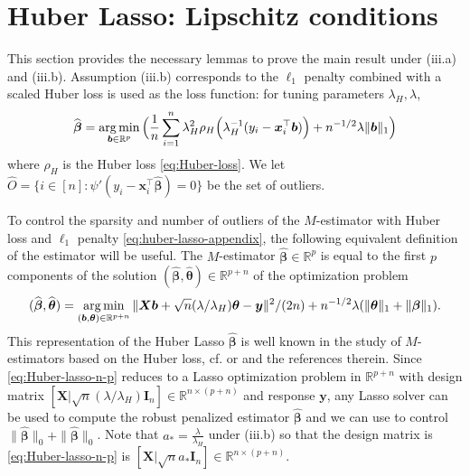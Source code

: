 \documentclass[11pt]{amsart}
\numberwithin{equation}{section}
\numberwithin{equation}{section}
\def\argmin{\mathop{\rm arg\, min}}
\def\argmin{\mathop{\rm arg\, min}}
\def\real{{\mathbb{R}}}
\def\R{{\real}}
\def\mathbold{\boldsymbol} %
\def\bb{\mathbold{b}}\def\bhat{\widehat{b}}\def\btil{\widetilde{b}}
\def\bI{\mathbold{I}}\def\hbI{{\widehat{\bI}}}\def\tbI{{\widetilde{\bI}}}
\def\bx{\mathbold{x}}\def\xhat{\widehat{x}}\def\xtil{\widetilde{x}}\def\xbar{{\overline x}}\def\vbx{{\bf x}}
\def\bX{\mathbold{X}}\def\hbX{{\widehat{\bX}}}\def\tbX{{\widetilde{\bX}}}\def\bXbar{{\overline \bX}}
\def\by{\mathbold{y}}\def\yhat{\widehat{y}}\def\ytil{\widetilde{y}}\def\ybar{{\overline y}}\def\vby{{\bf y}}
\def\bbeta{\mathbold{\beta}}\def\betahat{\widehat{\beta}}\def\hbeta{\widehat{\beta}}
\def\hbbeta{{{\widehat{\bbeta}}}}
\def\btheta{\mathbold{\theta}}\def\thetahat{\widehat{\theta}}\def\htheta{\widehat{\theta}}
\def\hbtheta{{\widehat{\btheta}}}\def\tbtheta{{\widetilde{\btheta}}}
\def\argmin{\mathop{\rm arg\, min}}
\newcommand\pb[1]{{ #1 }}
\begin{document}
\section{Huber Lasso: Lipschitz conditions}
\label{sec:appendix_huber_lasso_new}

This section provides the necessary lemmas to prove
the main result under (iii.a) and (iii.b).
Assumption (iii.b) corresponds to
the $\ell_1$ penalty combined with a scaled Huber loss
is used as the loss function:
for tuning parameters $\lambda_H,\lambda$,
\begin{equation}
    \label{eq:huber-lasso-appendix}
\hbbeta=\argmin_{\bb\in\R^p}
\Big(
   \frac 1 n \sum_{i=1}^n \lambda_H^2 \rho_H\Big( \lambda_H^{-1}(y_i-\bx_i^\top\bb)\Big)
   + n^{-1/2} \lambda  \|\bb\|_1
\Big)
\end{equation}
where $\rho_H$ is the Huber loss \eqref{eq:Huber-loss}.
We let $\hat O =\{i\in[n]: \psi'(y_i-\bx_i^\top\hbbeta)=0 \}$ be the set of outliers.

To control the sparsity and number of outliers of the $M$-estimator
with Huber loss and $\ell_1$ penalty \eqref{eq:huber-lasso-appendix},
the following equivalent definition of the estimator will be useful.
    The $M$-estimator $\hbbeta\in\R^p$ is equal to the first $p$ components
    of the solution $(\hbbeta,\hbtheta)\in\R^{p+n}$ of the optimization
    problem
    \begin{equation}
        \label{eq:Huber-lasso-n-p}
    (\hbbeta,\hbtheta) = \argmin_{(\bb,\btheta)\in\R^{p+n}}
    \|\bX\bb + \sqrt n \pb{(\lambda/\lambda_H)} \btheta - \by\|^2/(2n) + n^{-1/2}\lambda (\|\btheta\|_1 
    + \|\bbeta\|_1)
    .
    \end{equation}
    This representation of the Huber Lasso $\hbbeta$ is well known
    in the study of $M$-estimators based on the Huber loss,
    cf. \cite[Section 6]{donoho2016high}
    or \cite{dalalyan2019outlier} and the references therein.
    Since
    \eqref{eq:Huber-lasso-n-p} reduces to a Lasso
    optimization problem in $\R^{p+n}$ with design matrix 
    $[\bX | \sqrt n \pb{(\lambda/\lambda_H)} \bI_n] \in\R^{n\times (p+n)}$ and response $\by$, any Lasso solver can be used to compute the robust
    penalized estimator $\hbbeta$
    and we can use  to control $\|\hbbeta\|_0+\|\hbbeta\|_0$.
    Note that $a_*=\frac{\lambda}{\lambda_H}$ under (iii.b)
    so that the design matrix is \eqref{eq:Huber-lasso-n-p}
    is $[\bX|\sqrt n a_* \bI_n]\in\R^{n\times (p+n)}$.
\end{document}
